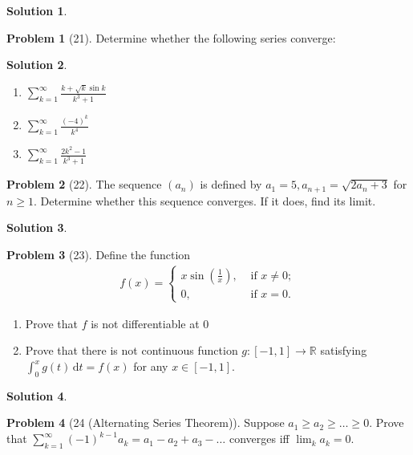 \documentclass[12pt]{article}
\theoremstyle{definition} %
\newtheorem{solution}{Solution}
\newtheorem{problem}{Problem}
\theoremstyle{plain} %
\begin{document}
\begin{solution}
    
\end{solution}
\begin{problem}[21]
   Determine whether the following series converge: 
\end{problem}
\begin{solution}
   \begin{enumerate}
    \item $\sum_{k=1}^{\infty} \frac{k+\sqrt{k} \sin k}{k^{3}+1}$
    \item $\sum_{k=1}^{\infty} \frac{(-4)^{k}}{k^{4}}$
    \item $\sum_{k=1}^{\infty} \frac{2k^{2}-1}{k^{3}+1}$   
   \end{enumerate} 
\end{solution}
\begin{problem}[22]
   The sequence $(a_{n})$ is defined by $a_1=5, a_{n+1}=\sqrt{2a_{n}+3} $ for $n\geq 1$. Determine whether this sequence converges. If it does, find its limit.    
\end{problem}
\begin{solution}
    
\end{solution}
\begin{problem}[23]
   Define the function 
   \begin{align}
  f(x) = \begin{cases}
    x\sin(\frac{1}{x}), &\text{ if }  x\neq 0;\\
    0, &\text{ if }  x=0.
  \end{cases}  
   \end{align} 
   \begin{enumerate}
    \item Prove that $f$ is not differentiable at $0$ 
    \item Prove that there is not continuous function $g:[-1,1]\to \mathbb{{R}}$ satisfying $\int_{0}^{x} g(t) \,\mathrm{d}t =f(x)$ for any $x\in [-1,1]$.  
   \end{enumerate}
\end{problem}
\begin{solution}
    
\end{solution}
\begin{problem}[24 (Alternating Series Theorem)]
   Suppose $a_1\geq a_2\geq \ldots \geq 0 $. Prove that $\sum_{k=1}^{\infty} (-1)^{k-1}a_{k}=a_{1}-a_{2}+a_3 - \ldots   $ converges iff $\lim_{k}a_{k}=0 $.   
\end{problem}
\end{document}
